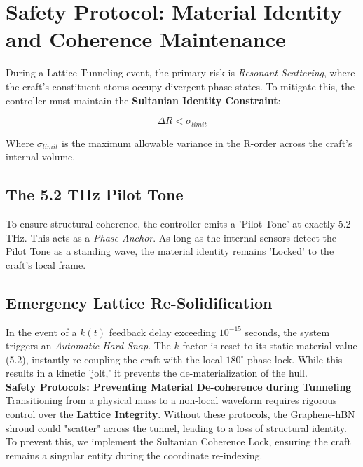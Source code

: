 \documentclass[11pt]{article}
\begin{document}
\section{Safety Protocol: Material Identity and Coherence Maintenance}

During a Lattice Tunneling event, the primary risk is \textit{Resonant Scattering}, where the craft's constituent atoms occupy divergent phase states. To mitigate this, the controller must maintain the \textbf{Sultanian Identity Constraint}:

\begin{equation}
    \Delta R < \sigma_{limit}
\end{equation}

Where $\sigma_{limit}$ is the maximum allowable variance in the R-order across the craft's internal volume. 

\subsection{The 5.2 THz Pilot Tone}
To ensure structural coherence, the controller emits a 'Pilot Tone' at exactly 5.2 THz. This acts as a \textit{Phase-Anchor}. As long as the internal sensors detect the Pilot Tone as a standing wave, the material identity remains 'Locked' to the craft's local frame.

\subsection{Emergency Lattice Re-Solidification}
In the event of a $k(t)$ feedback delay exceeding $10^{-15}$ seconds, the system triggers an \textit{Automatic Hard-Snap}. The $k$-factor is reset to its static material value (5.2), instantly re-coupling the craft with the local $180^\circ$ phase-lock. While this results in a kinetic 'jolt,' it prevents the de-materialization of the hull.\\


\textbf{Safety Protocols: Preventing Material De-coherence during Tunneling}\\
Transitioning from a physical mass to a non-local waveform requires rigorous control over the \textbf{Lattice Integrity}. Without these protocols, the Graphene-hBN shroud could "scatter" across the tunnel, leading to a loss of structural identity.\\

To prevent this, we implement the Sultanian Coherence Lock, ensuring the craft remains a singular entity during the coordinate re-indexing.
\end{document}
